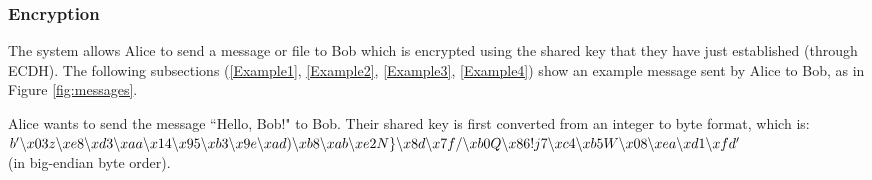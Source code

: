 \documentclass[12pt,a4paper]{article}
\begin{document}
\subsubsection{Encryption} \noindent \label{Example1}
The system allows Alice to send a message or file to Bob which is encrypted using the shared key that they have just established (through ECDH). 
The following subsections (\ref{Example1}, \ref{Example2}, \ref{Example3}, \ref{Example4}) show an example message sent by Alice to Bob, 
as in Figure \ref{fig:messages}. 

\vspace{1mm}

Alice wants to send the message ``Hello, Bob!" to Bob. 
Their shared key is first converted from an integer to byte format, which is: \\
{\footnotesize $b' \char`\\x03z \char`\\xe8 \char`\\xd3 \char`\\xaa \char`\\x14 \char`\\x95 \char`\\xb3 \char`\\x9e \char`\\xad) \char`\\xb8 \char`\\xab \\ 
\char`\\xe2N\} \char`\\x8d \char`\\x7f/ \char`\\xb0Q \char`\\x86!j7 \char`\\xc4 \char`\\xb5W \char`\\x08 \char`\\xea \char`\\xd1 \char`\\xfd '$} \\
(in big-endian byte order). 
\end{document}
